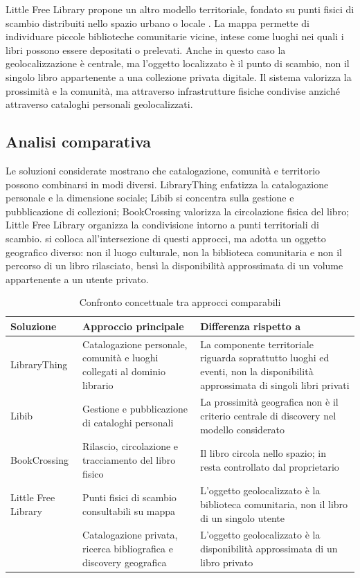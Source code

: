 Little Free Library propone un altro modello territoriale, fondato su punti fisici di scambio distribuiti nello spazio urbano o locale \cite{littlefreelibrary}. La mappa permette di individuare piccole biblioteche comunitarie vicine, intese come luoghi nei quali i libri possono essere depositati o prelevati. Anche in questo caso la geolocalizzazione è centrale, ma l'oggetto localizzato è il punto di scambio, non il singolo libro appartenente a una collezione privata digitale. Il sistema valorizza la prossimità e la comunità, ma attraverso infrastrutture fisiche condivise anziché attraverso cataloghi personali geolocalizzati.

\subsection{Analisi comparativa}
\label{subsec:analisi-comparativa}

Le soluzioni considerate mostrano che catalogazione, comunità e territorio possono combinarsi in modi diversi. LibraryThing enfatizza la catalogazione personale e la dimensione sociale; Libib si concentra sulla gestione e pubblicazione di collezioni; BookCrossing valorizza la circolazione fisica del libro; Little Free Library organizza la condivisione intorno a punti territoriali di scambio. \projectname{} si colloca all'intersezione di questi approcci, ma adotta un oggetto geografico diverso: non il luogo culturale, non la biblioteca comunitaria e non il percorso di un libro rilasciato, bensì la disponibilità approssimata di un volume appartenente a un utente privato.

\begin{table}[H]
    \centering
    \caption{Confronto concettuale tra approcci comparabili}
    \label{tab:confronto-soluzioni}
    \small
    \begin{tabularx}{\textwidth}{p{}XX}
        \toprule
        \textbf{Soluzione} & \textbf{Approccio principale} & \textbf{Differenza rispetto a \projectname{}} \\
        \midrule
        LibraryThing & Catalogazione personale, comunità e luoghi collegati al dominio librario & La componente territoriale riguarda soprattutto luoghi ed eventi, non la disponibilità approssimata di singoli libri privati \\
        Libib & Gestione e pubblicazione di cataloghi personali & La prossimità geografica non è il criterio centrale di discovery nel modello considerato \\
        BookCrossing & Rilascio, circolazione e tracciamento del libro fisico & Il libro circola nello spazio; in \projectname{} resta controllato dal proprietario \\
        Little Free Library & Punti fisici di scambio consultabili su mappa & L'oggetto geolocalizzato è la biblioteca comunitaria, non il libro di un singolo utente \\
        \projectname{} & Catalogazione privata, ricerca bibliografica e discovery geografica & L'oggetto geolocalizzato è la disponibilità approssimata di un libro privato \\
        \bottomrule
    \end{tabularx}
\end{table}

